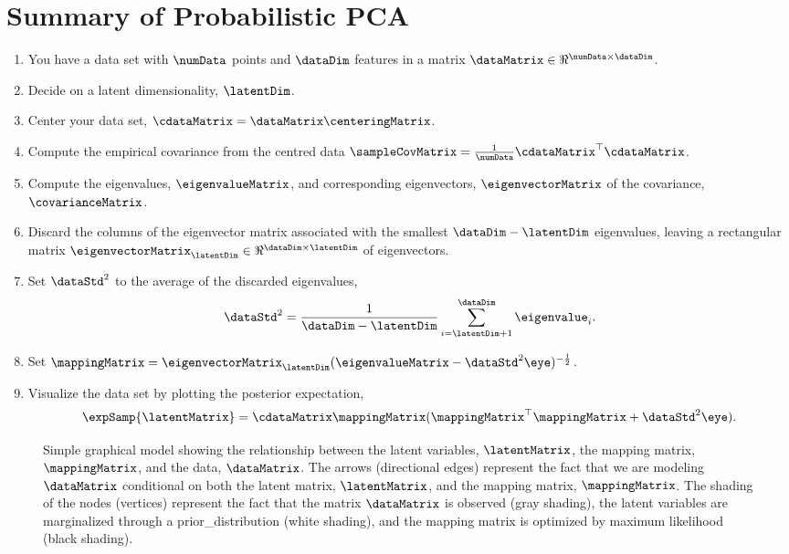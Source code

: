 \section{Summary of Probabilistic PCA}
\begin{enumerate}
\item You have a data set with $\numData$ points and $\dataDim$ features in a matrix $\dataMatrix \in \Re^{\numData \times \dataDim}$.
 \item Decide on a latent dimensionality, $\latentDim$.
 \item Center your data set, $\cdataMatrix = \dataMatrix\centeringMatrix$.
 \item Compute the empirical covariance from the centred data $\sampleCovMatrix = \frac{1}{\numData}\cdataMatrix^\top\cdataMatrix$.
 \item Compute the eigenvalues, $\eigenvalueMatrix$, and corresponding eigenvectors, $\eigenvectorMatrix$ of the covariance, $\covarianceMatrix$.
 \item Discard the columns of the eigenvector matrix associated with the smallest $\dataDim-\latentDim$ eigenvalues, leaving a rectangular matrix $\eigenvectorMatrix_\latentDim\in \Re^{\dataDim\times\latentDim}$ of eigenvectors. 
 \item Set $\dataStd^2$ to the average of the discarded eigenvalues,
   \[
   \dataStd^2 = \frac{1}{\dataDim-\latentDim} \sum_{i=\latentDim+1}^\dataDim \eigenvalue_i.
   \]
 \item Set $\mappingMatrix = \eigenvectorMatrix_\latentDim (\eigenvalueMatrix-\dataStd^2\eye)^{-\frac{1}{2}}$.
 \item Visualize the data set by plotting the posterior expectation,
   \[
   \expSamp{\latentMatrix} = \cdataMatrix\mappingMatrix(\mappingMatrix^\top\mappingMatrix + \dataStd^2 \eye).
   \]
\end{enumerate}
  

\begin{figure}
  \begin{center}
    
  \end{center}
  \caption{Simple graphical model showing the relationship between the
    latent variables, $\latentMatrix$, the mapping matrix,
    $\mappingMatrix$, and the data, $\dataMatrix$. The arrows
    (directional edges) represent the fact that we are modeling
    $\dataMatrix$ conditional on both the latent matrix,
    $\latentMatrix$, and the mapping matrix, $\mappingMatrix$. The
    shading of the nodes (vertices) represent the fact that the matrix
    $\dataMatrix$ is observed (gray shading), the latent variables are
    marginalized through a \gls{prior_distribution} (white shading), and the
    mapping matrix is optimized by maximum likelihood (black shading).}\label{fig:ppcaGraph}
\end{figure}

